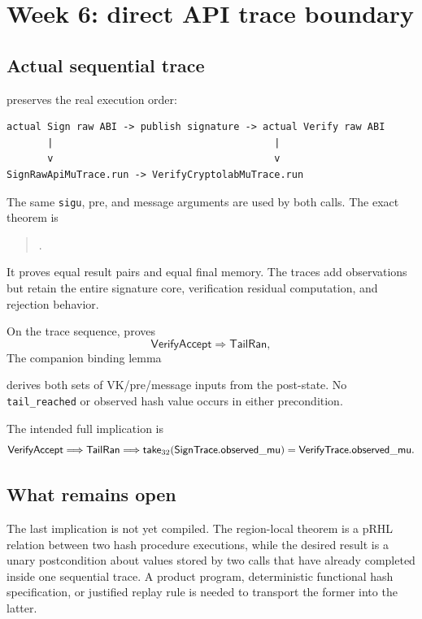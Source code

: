\section{Week 6: direct API trace boundary}

\subsection{Actual sequential trace}

 preserves the real execution order:
\begin{verbatim}
actual Sign raw ABI -> publish signature -> actual Verify raw ABI
       |                                      |
       v                                      v
SignRawApiMuTrace.run -> VerifyCryptolabMuTrace.run
\end{verbatim}
The same \texttt{sigu}, pre, and message arguments are used by both calls.
The exact theorem is
\begin{quote}
\small{}.
\end{quote}
It proves equal result pairs and equal final memory. The traces add observations but retain the
entire signature core, verification residual computation, and rejection
behavior.

On the trace sequence,
 proves
\[
  \mathsf{VerifyAccept}\Longrightarrow\mathsf{TailRan},
\]
The companion binding lemma
\begin{center}
\small{}
\end{center}
derives both sets of VK/pre/message inputs from the post-state. No
\texttt{tail\_reached}
or observed hash value occurs in either precondition.

The intended full implication is
\[
 \mathsf{VerifyAccept}
 \Longrightarrow \mathsf{TailRan}
 \Longrightarrow
 \mathsf{take}_{32}(\mathsf{SignTrace.observed\_mu})
 = \mathsf{VerifyTrace.observed\_mu}.
\]

\subsection{What remains open}

The last implication is not yet compiled. The region-local theorem is a pRHL
relation between two hash procedure executions, while the desired result is a
unary postcondition about values stored by two calls that have already
completed inside one sequential trace. A product program, deterministic
functional hash specification, or justified replay rule is needed to
transport the former into the latter.

